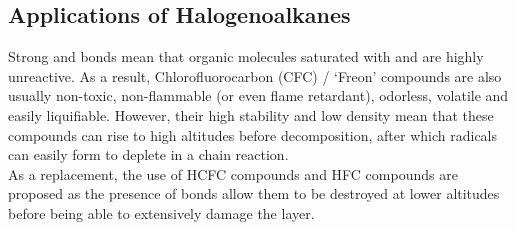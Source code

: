 \documentclass[../main]{subfiles}
\begin{document}
	\subsection{Applications of Halogenoalkanes}

	Strong  and  bonds mean that organic molecules saturated with  and  are highly unreactive. As a result, Chlorofluorocarbon (CFC) / `Freon' compounds are also usually non-toxic, non-flammable (or even flame retardant), odorless, volatile and easily liquifiable. However, their high stability and low density mean that these compounds can rise to high altitudes before decomposition, after which  radicals can easily form to deplete  in a chain reaction. \\

	As a replacement, the use of HCFC compounds and HFC compounds are proposed as the presence of  bonds allow them to be destroyed at lower altitudes before being able to extensively damage the  layer.
	
\end{document}
